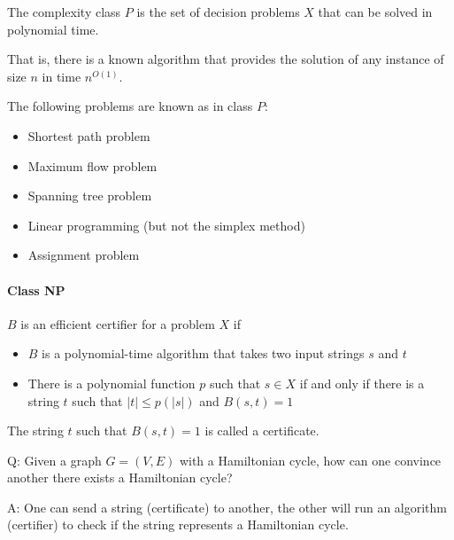                 \begin{definition}[Class $P$]
                    The complexity class $P$ is the set of decision problems $X$ that can be solved in polynomial time.
                \end{definition}

                That is, there is a known algorithm that provides the solution of any instance of size $n$ in time $n^{O(1)}$.

                \begin{example} The following problems are known as in class $P$:
                    \begin{itemize}
                        \item Shortest path problem
                        \item Maximum flow problem
                        \item Spanning tree problem
                        \item Linear programming (but not the simplex method)
                        \item Assignment problem
                    \end{itemize}
                \end{example}

            \paragraph{Class NP}
                \begin{definition}
                    $B$ is an efficient certifier for a problem $X$ if
                    \begin{itemize}
                        \item $B$ is a polynomial-time algorithm that takes two input strings $s$ and $t$
                        \item There is a polynomial function $p$ such that $s \in X$ if and only if there is a string $t$ such that $|t| \le p(|s|)$ and $B(s, t) = 1$
                    \end{itemize}
                    The string $t$ such that $B(s, t) = 1$ is called a certificate.
                \end{definition}

                \begin{example}
                    Q: Given a graph $G = (V, E)$ with a Hamiltonian cycle, how can one convince another there exists a Hamiltonian cycle? 

                    A: One can send a string (certificate) to another, the other will run an algorithm (certifier) to check if the string represents a Hamiltonian cycle.
                \end{example}

